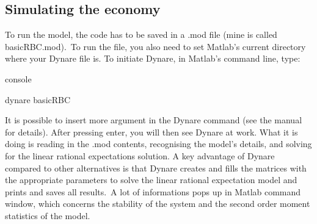 \documentclass[a4paper,12pt]{article}%
\begin{document}
\subsection{Simulating the economy}

To run the model, the code has to be saved in a .mod file (mine is called
basicRBC.mod).\ To run the file, you also need to set Matlab's current
directory where your Dynare file is. To initiate Dynare, in Matlab's command
line, type:%

\vspace{3ex}
\begin{myconsole}{console}%


\textsf{dynare basicRBC}%

\end{myconsole}
\vspace{3ex}%


It is possible to insert more argument in the Dynare command (see the manual
for details). After pressing enter, you will then see Dynare at work. What it
is doing is reading in the .mod contents, recognising the model's details, and
solving for the linear rational expectations solution. A key advantage of
Dynare compared to other alternatives is that Dynare creates and fills the
matrices with the appropriate parameters to solve the linear rational
expectation model and prints and saves all results.\ A lot of informations
pops up in Matlab command window, which concerns the stability of the system
and the second order moment statistics of the model.%
\end{document}
